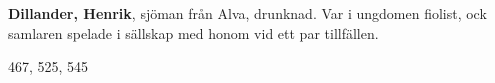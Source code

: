 \textbf{Dillander, Henrik}, sjöman från Alva, drunknad. Var i ungdomen fiolist, ock samlaren spelade i sällskap
med honom vid ett par tillfällen. 

467, 525, 545 
